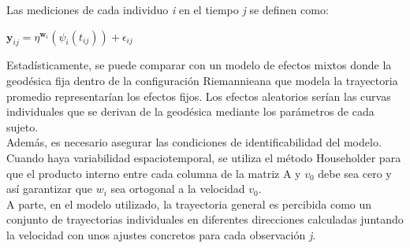 \documentclass[12pt]{article}
\begin{document}
Las mediciones de cada individuo \textit{i} en el tiempo \textit{j} se definen como:
\begin{center}
	$\textbf{y}_{ij}=\eta^{\textbf{w}_{i}}(\psi_{i}(t_{ij}))+\epsilon_{ij}$
\end{center}

Estadísticamente, se puede comparar con un modelo de efectos mixtos donde la geodésica fija dentro de la configuración Riemannieana que modela la trayectoria promedio representarían los efectos fijos. Los efectos aleatorios serían las curvas individuales que se derivan de la geodésica mediante los parámetros de cada sujeto.\\

Además, es necesario asegurar las condiciones de identificabilidad del modelo. Cuando haya variabilidad espaciotemporal, se utiliza el método Householder para que el producto interno entre cada columna de la matriz A y $v_{0}$ debe sea cero y así garantizar que $\textit{w}_{i}$ sea ortogonal a la velocidad $v_{0}$.\\

A parte, en el modelo utilizado, la trayectoria general es percibida como un conjunto de trayectorias individuales en diferentes direcciones calculadas juntando la velocidad con unos ajustes concretos para cada observación \textit{j}.\\
\end{document}
